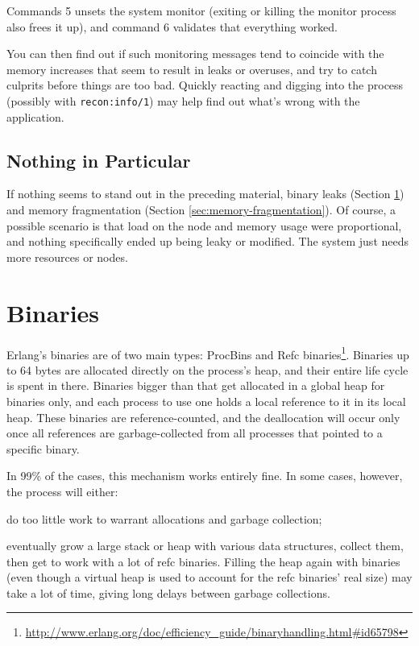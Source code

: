 \documentclass[11pt, oneside]{book}   	%
\newcommand{\function}[1]{\Verb`#1`}
\begin{document}
Commands 5 unsets the system monitor (exiting or killing the monitor process also frees it up), and command 6 validates that everything worked.

You can then find out if such monitoring messages tend to coincide with the memory increases that seem to result in leaks or overuses, and try to catch culprits before things are too bad. Quickly reacting and digging into the process (possibly with \function{recon:info/1}) may help find out what's wrong with the application.

\subsection{Nothing in Particular}

If nothing seems to stand out in the preceding material, binary leaks (Section \ref{sec:binaries}) and memory fragmentation (Section \ref{sec:memory-fragmentation}). Of course, a possible scenario is that load on the node and memory usage were proportional, and nothing specifically ended up being leaky or modified. The system just needs more resources or nodes.

\section{Binaries}
\label{sec:binaries}

Erlang's binaries are of two main types: ProcBins and Refc binaries\footnote{\href{http://www.erlang.org/doc/efficiency\_guide/binaryhandling.html\#id65798}{http://www.erlang.org/doc/efficiency\_guide/binaryhandling.html\#id65798}}. Binaries up to 64 bytes are allocated directly on the process's heap, and their entire life cycle is spent in there. Binaries bigger than that get allocated in a global heap for binaries only, and each process to use one holds a local reference to it in its local heap. These binaries are reference-counted, and the deallocation will occur only once all references are garbage-collected from all processes that pointed to a specific binary.

In 99\% of the cases, this mechanism works entirely fine. In some cases, however, the process will either:

\begin{enumerate*}
	\item do too little work to warrant allocations and garbage collection;
         \item eventually grow a large stack or heap with various data structures, collect them, then get to work with a lot of refc binaries. Filling the heap again with binaries (even though a virtual heap is used to account for the refc binaries' real size) may take a lot of time, giving long delays between garbage collections.
\end{enumerate*}
\end{document}
